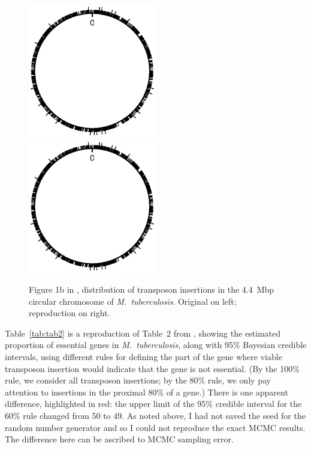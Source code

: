 \begin{figure}
\includegraphics[viewport=179 299 438 517, width=0.50\textwidth]{../talk/Figs/circlefig.ps}
\hfill
\includegraphics[viewport=179 299 438 517, width=0.50\textwidth]{../reproduction/Figs/circlefig.ps}

\caption{Figure 1b in \citet{lamichhane2003}, distribution of
transposon insertions in the 4.4~Mbp circular chromosome of \emph{M.\
tuberculosis}. Original on left; reproduction on
right.\label{fig:fig1b}}
\end{figure}

Table~\ref{tab:tab2} is a reproduction of Table~2
from \citet{lamichhane2003}, showing the estimated proportion of
essential genes in \emph{M.\ tuberculosis}, along with 95\% Bayesian
credible intervals, using different rules for
defining the part of the gene where viable transposon insertion would
indicate that the gene is not essential. (By the 100\% rule, we
consider all transposon insertions; by the 80\% rule, we only pay
attention to insertions in the proximal 80\% of a gene.)
There is one apparent difference, highlighted in red: the upper
limit of the 95\% credible interval for the 60\% rule changed from 50
to 49. As noted above, I had not saved the seed for the random number
generator and so I could not reproduce the exact MCMC results. The
difference here can be ascribed to MCMC sampling error.

